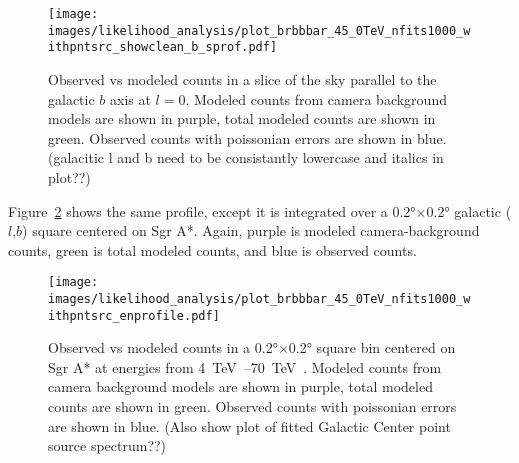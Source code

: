   \begin{figure}[h]
    \centering
    \texttt{[image: images/likelihood\_analysis/plot\_brbbbar\_45\_0TeV\_nfits1000\_withpntsrc\_showclean\_b\_sprof.pdf]}
    \caption[Galactic Center Profile vs Galactic $b$]{
      Observed vs modeled counts in a slice of the sky parallel to the galactic $b$ axis at $l=0$.
      Modeled counts from camera background models are shown in purple, total modeled counts are shown in green.
      Observed counts with poissonian errors are shown in blue.
      {\color{red}(galacitic l and b need to be consistantly lowercase and italics in plot??)}
    }
    \label{fig:gc_profile_gal_b}
  \end{figure}

  Figure~\ref{fig:gc_profile_energy} shows the same profile, except it is integrated over a \ang{0.2}$\times$\ang{0.2} galactic ($l$,$b$) square centered on Sgr A*.
  Again, purple is modeled camera-background counts, green is total modeled counts, and blue is observed counts.
  
  \begin{figure}[h]
    \centering
    \texttt{[image: images/likelihood\_analysis/plot\_brbbbar\_45\_0TeV\_nfits1000\_withpntsrc\_enprofile.pdf]}
    \caption[Galactic Center Profile vs Energy]{
      Observed vs modeled counts in a \ang{0.2}$\times$\ang{0.2} square bin centered on Sgr A* at energies from \SIrange{4}{70}{\TeV{}}.
      Modeled counts from camera background models are shown in purple, total modeled counts are shown in green.
      Observed counts with poissonian errors are shown in blue.
      {\color{red}(Also show plot of fitted Galactic Center point source spectrum??)}
      }
    \label{fig:gc_profile_energy}
  \end{figure}
  
